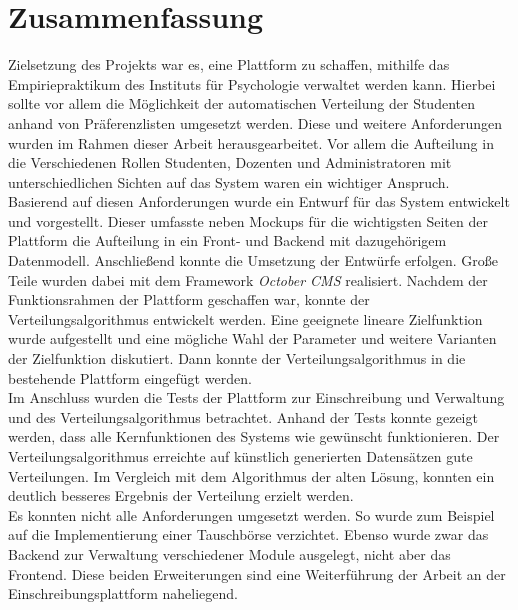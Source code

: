 \chapter{Zusammenfassung}
\label{chapter:summary}
    Zielsetzung des Projekts war es, eine Plattform zu schaffen, mithilfe das Empiriepraktikum des Instituts für Psychologie verwaltet werden kann.
    Hierbei sollte vor allem die Möglichkeit der automatischen Verteilung der Studenten anhand von Präferenzlisten umgesetzt werden.
    Diese und weitere Anforderungen wurden im Rahmen dieser Arbeit herausgearbeitet.
    Vor allem die Aufteilung in die Verschiedenen Rollen Studenten, Dozenten und Administratoren mit unterschiedlichen Sichten auf das System waren ein wichtiger Anspruch.
    Basierend auf diesen Anforderungen wurde ein Entwurf für das System entwickelt und vorgestellt.
    Dieser umfasste neben Mockups für die wichtigsten Seiten der Plattform die Aufteilung in ein Front- und Backend mit dazugehörigem Datenmodell.
    Anschließend konnte die Umsetzung der Entwürfe erfolgen.
    Große Teile wurden dabei mit dem Framework \textit{October CMS} realisiert.
    Nachdem der Funktionsrahmen der Plattform geschaffen war, konnte der Verteilungsalgorithmus entwickelt werden.
    Eine geeignete lineare Zielfunktion wurde aufgestellt und eine mögliche Wahl der Parameter und weitere Varianten der Zielfunktion diskutiert.
    Dann konnte der Verteilungsalgorithmus in die bestehende Plattform eingefügt werden.\\
    
    Im Anschluss wurden die Tests der Plattform zur Einschreibung und Verwaltung und des Verteilungsalgorithmus betrachtet.
    Anhand der Tests konnte gezeigt werden, dass alle Kernfunktionen des Systems wie gewünscht funktionieren.
    Der Verteilungsalgorithmus erreichte auf künstlich generierten Datensätzen gute Verteilungen.
    Im Vergleich mit dem Algorithmus der alten Lösung, konnten ein deutlich besseres Ergebnis der Verteilung erzielt werden.\\
    
    Es konnten nicht alle Anforderungen umgesetzt werden.
    So wurde zum Beispiel auf die Implementierung einer Tauschbörse verzichtet.
    Ebenso wurde zwar das Backend zur Verwaltung verschiedener Module ausgelegt, nicht aber das Frontend.
    Diese beiden Erweiterungen sind eine Weiterführung der Arbeit an der Einschreibungsplattform naheliegend.\\
    
    




        
    
